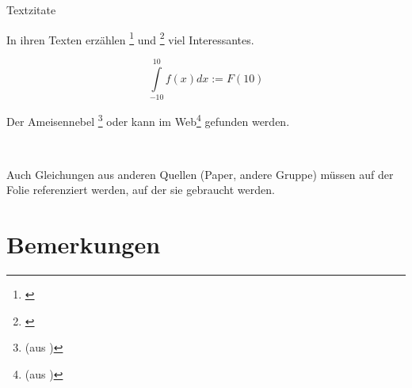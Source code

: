 \documentclass[aspectratio=169]{beamer}
\begin{document}
\begin{frame}{Textzitate}{ }


In ihren Texten erz\"{a}hlen \citeauthor{Gompf2006}\footnote{\cite{Gompf2006}  } und \citeauthor{Klinkicht2013}\footnote{\cite{Klinkicht2013} } viel Interessantes.

\begin{equation*}
  \int\limits_{-10}^{10} f(x)   dx := F(10)
\end{equation*}

Der Ameisennebel \footnote{(aus \cite{Ameisennebel} )}
oder kann im Web\footnote{(aus \cite{Ameisennebel} )} gefunden werden.

$_{}$

Auch Gleichungen aus anderen Quellen (Paper, andere Gruppe) m\"{u}ssen auf der Folie referenziert werden, auf der sie gebraucht werden.

\end{frame}


\section{Bemerkungen}
\end{document}
